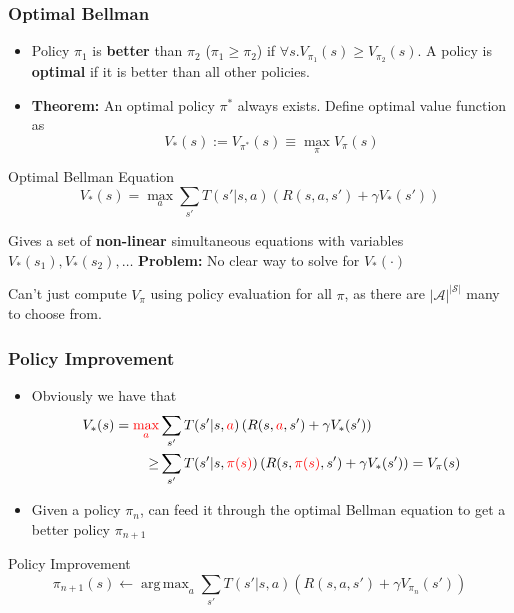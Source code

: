 \documentclass[10pt,a4paper, handout]{beamer}
\renewcommand{\S}{\mathcal{S}}
\newcommand{\A}{\mathcal{A}}
\DeclareMathOperator*{\argmax}{arg\,max}
\newcommand{\red}[1]{\textcolor{red}{#1}}
\begin{document}
\begin{frame}
	\frametitle{Optimal Bellman}
	\begin{itemize}
		\item Policy $\pi_1$ is \textbf{better} than $\pi_2$ ($\pi_1 \geq \pi_2$)
		if $\forall s. V_{\pi_1}(s) \geq V_{\pi_2}(s)$. A policy is \textbf{optimal}
		if it is better than all other policies. 
		\pause
		\item \textbf{Theorem:} An optimal policy $\pi^*$ always exists. 
		Define optimal value function as 
		$$
		V_*(s) := V_{\pi^*}(s) \equiv \max_{\pi} V_{\pi}(s)
		$$
		\pause
	\end{itemize}

\begin{block}{Optimal Bellman Equation}
	$$
	V_*(s) = \max_a \sum_{s'} T(s' | s, a) \left( R(s,a,s') + \gamma V_*(s') \right)
	$$
\end{block}
\pause
Gives a set of \textbf{non-linear} simultaneous equations with variables
$ V_*(s_1),  V_*(s_2), \ldots$
\pause
\textbf{Problem:} No clear way to solve for $V_*(\cdot)$
\pause

Can't just compute $V_\pi$ using policy evaluation for all $\pi$, as
there are $|\A|^{|\S|}$ many to choose from.

\end{frame}

\begin{frame}
	\frametitle{Policy Improvement}
	\begin{itemize}
		\item Obviously we have that
		\begin{align*}
		V_*(s) = \red{\max_a} &\sum_{s'} T(s' | s, \red{a}) \left( R(s,\red{a},s') + \gamma V_*(s') \right) \\
		\geq 
		& \sum_{s'} T(s' | s, \red{\pi(s)}) \left( R(s,\red{\pi(s)},s') + \gamma V_*(s') \right) = V_\pi(s)
		\end{align*}
		\pause
		
		\item Given a policy $\pi_n$, can feed it through the optimal Bellman
		equation to get a better policy $\pi_{n+1}$
	\end{itemize}
\pause
\begin{block}{Policy Improvement}
$$
\pi_{n+1}(s) \leftarrow \argmax_a \sum_{s'} T(s' | s,a) 
\left( R(s,a,s') + \gamma V_{\pi_n}(s') \right)
$$
\end{block}
\end{frame}
\end{document}
